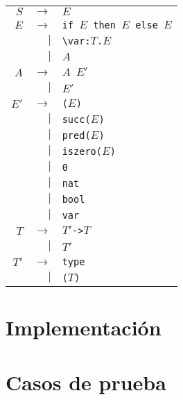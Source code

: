 \documentclass[11pt]{article}
\begin{document}
\begin{tabular}{rrl}
$S$  & $\rightarrow$ \qquad & $E$ \\
$E$  & $\rightarrow$ \qquad & \verb|if |$E$\verb| then |$E$\verb| else |$E$ \\
     & $\vert$              & \verb|\var:|$T$\verb|.|$E$ \\
     & $\vert$              & $A$ \\
$A$  & $\rightarrow$ \qquad & $A$\verb| |$E'$ \\
     & $\vert$              & $E'$ \\
$E'$ & $\rightarrow$ \qquad & \verb|(|$E$\verb|)| \\
     & $\vert$              & \verb|succ(|$E$\verb|)| \\
     & $\vert$              & \verb|pred(|$E$\verb|)| \\
     & $\vert$              & \verb|iszero(|$E$\verb|)| \\
     & $\vert$              & \verb|0| \\
     & $\vert$              & \verb|nat| \\
     & $\vert$              & \verb|bool| \\
     & $\vert$              & \verb|var| \\
$T$  & $\rightarrow$ \qquad & $T'$\verb|->|$T$ \\
     & $\vert$              & $T'$ \\
$T'$ & $\rightarrow$ \qquad & \verb|type| \\
     & $\vert$              & \verb|(|$T$\verb|)| \\
\end{tabular}


\section{Implementación}



\section{Casos de prueba}
\end{document}
